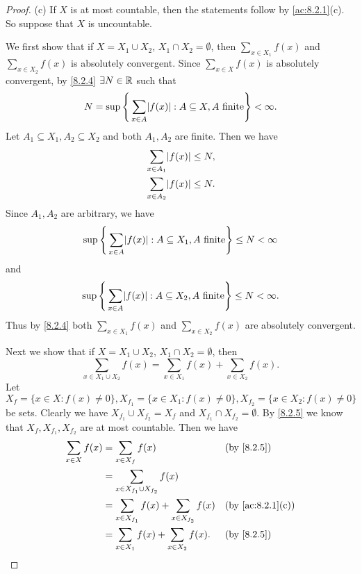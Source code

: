 \begin{proof}{(c)}
  If \(X\) is at most countable, then the statements follow by \cref{ac:8.2.1}(c).
  So suppose that \(X\) is uncountable.

  We first show that if \(X = X_1 \cup X_2\), \(X_1 \cap X_2 = \emptyset\), then \(\sum_{x \in X_1} f(x)\) and \(\sum_{x \in X_2} f(x)\) is absolutely convergent.
  Since \(\sum_{x \in X} f(x)\) is absolutely convergent, by \cref{8.2.4} \(\exists N \in \mathbb{R}\) such that
  \[
    N = \sup\Bigg\{\sum_{x \in A} \abs{f(x)} : A \subseteq X, A \text{ finite}\Bigg\} < \infty.
  \]
  Let \(A_1 \subseteq X_1, A_2 \subseteq X_2\) and both \(A_1, A_2\) are finite.
  Then we have
  \begin{align*}
     & \sum_{x \in A_1} \abs{f(x)} \leq N, \\
     & \sum_{x \in A_2} \abs{f(x)} \leq N.
  \end{align*}
  Since \(A_1, A_2\) are arbitrary, we have
  \[
    \sup\Bigg\{\sum_{x \in A} \abs{f(x)} : A \subseteq X_1, A \text{ finite}\Bigg\} \leq N < \infty
  \]
  and
  \[
    \sup\Bigg\{\sum_{x \in A} \abs{f(x)} : A \subseteq X_2, A \text{ finite}\Bigg\} \leq N < \infty.
  \]
  Thus by \cref{8.2.4} both \(\sum_{x \in X_1} f(x)\) and \(\sum_{x \in X_2} f(x)\) are absolutely convergent.

  Next we show that if \(X = X_1 \cup X_2\), \(X_1 \cap X_2 = \emptyset\), then
  \[
    \sum_{x \in X_1 \cup X_2} f(x) = \sum_{x \in X_1} f(x) + \sum_{x \in X_2} f(x).
  \]
  Let \(X_f = \{x \in X : f(x) \neq 0\}, X_{f_1} = \{x \in X_1 : f(x) \neq 0\}, X_{f_2} = \{x \in X_2 : f(x) \neq 0\}\) be sets.
  Clearly we have \(X_{f_1} \cup X_{f_2} = X_f\) and \(X_{f_1} \cap X_{f_2} = \emptyset\).
  By \cref{8.2.5} we know that \(X_f, X_{f_1}, X_{f_2}\) are at most countable.
  Then we have
  \begin{align*}
    \sum_{x \in X} f(x) & = \sum_{x \in X_f} f(x)                                 &  & \by{8.2.5}                     \\
                        & = \sum_{x \in X_{f_1} \cup X_{f_2}} f(x)                                                    \\
                        & = \sum_{x \in X_{f_1}} f(x) + \sum_{x \in X_{f_2}} f(x) &  & \text{(by \cref{ac:8.2.1}(c))} \\
                        & = \sum_{x \in X_1} f(x) + \sum_{x \in X_2} f(x).        &  & \by{8.2.5}
  \end{align*}


\end{proof}

